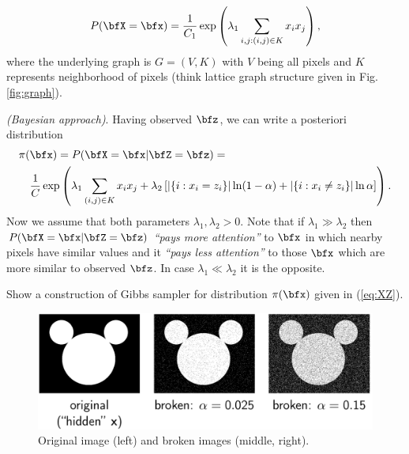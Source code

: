 \documentclass[a4paper,12pt]{article}
\begin{document}
\begin{enumerate}
\begin{equation}
P(\bfX=\bfx)={1\over C_1}\exp\left(\lambda_1 \sum_{i,j: (i,j)\in K} x_i x_j\right),
\end{equation}
where the underlying graph is $G=(V,K)$ with $V$ being all pixels and $K$ represents neighborhood of pixels
(think lattice graph structure given in Fig. \ref{fig:graph}).
\medskip\par
\textsl{(Bayesian approach)}. Having observed $\bfz$, we can write a posteriori distribution
  \begin{eqnarray}
  \lefteqn{\pi(\bfx)= P(\bfX=\bfx| \bfZ=\bfz)=} \label{eq:XZ}\\
  & &  {1\over C}\exp\left(\lambda_1 \sum_{(i,j)\in K} x_i x_j+\lambda_2\left[|\{i:x_i=z_i\}|\ln(1-\alpha)+|\{i:x_i\neq z_i\}|\ln\alpha\right]\right).\nonumber
  \end{eqnarray}
  Now we assume that both parameters $\lambda_1, \lambda_2>0$. Note that if $\lambda_1 \gg \lambda_2$
  then $P(\bfX=\bfx| \bfZ=\bfz)$ \textsl{``pays more attention''} to $\bfx$ in which nearby pixels have similar values
  and it \textsl{``pays less attention''} to those $\bfx$ which are more similar to observed $\bfz$.
  In case $\lambda_1\ll\lambda_2$ it is the opposite.
  \medskip\par
  Show a construction of Gibbs sampler for distribution $\pi(\bfx)$ given in (\ref{eq:XZ}).




 \begin{figure}
 \begin{center}
 \includegraphics[width=400pt]{pics/mickey_mouse_broken.png}
 \caption{Original image (left) and broken images (middle, right).}\label{fig:mickey}
 \end{center}
 \end{figure}



\end{enumerate}
\end{document}
